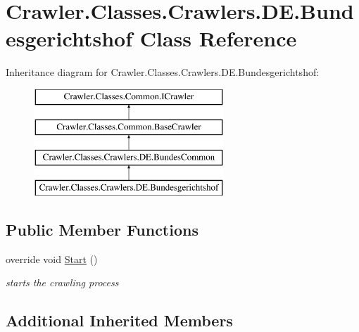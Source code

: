 \hypertarget{class_crawler_1_1_classes_1_1_crawlers_1_1_d_e_1_1_bundesgerichtshof}{\section{Crawler.\-Classes.\-Crawlers.\-D\-E.\-Bundesgerichtshof Class Reference}
\label{class_crawler_1_1_classes_1_1_crawlers_1_1_d_e_1_1_bundesgerichtshof}
}
Inheritance diagram for Crawler.\-Classes.\-Crawlers.\-D\-E.\-Bundesgerichtshof\-:\begin{figure}[H]
\begin{center}
\leavevmode
\includegraphics[height=4.000000cm]{class_crawler_1_1_classes_1_1_crawlers_1_1_d_e_1_1_bundesgerichtshof}
\end{center}
\end{figure}
\subsection*{Public Member Functions}
\begin{DoxyCompactItemize}
\item 
override void \hyperlink{class_crawler_1_1_classes_1_1_crawlers_1_1_d_e_1_1_bundesgerichtshof_a22394430f7cfb0ea4da214037fe61703}{Start} ()
\begin{DoxyCompactList}\small\item\em starts the crawling process \end{DoxyCompactList}\end{DoxyCompactItemize}
\subsection*{Additional Inherited Members}


